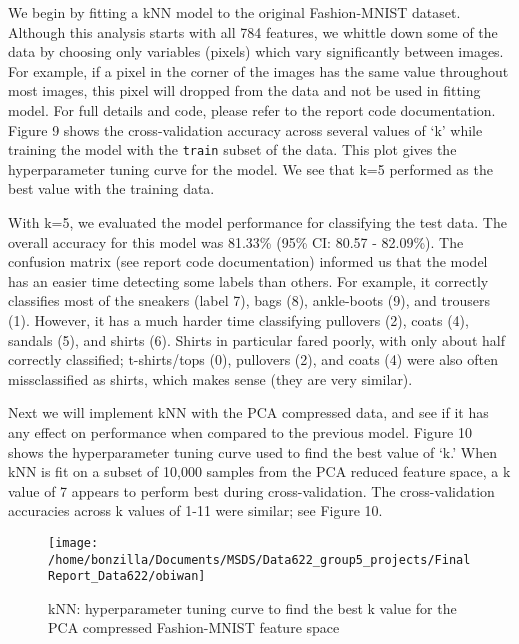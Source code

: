 \documentclass{article}
\begin{document}
We begin by fitting a kNN model to the original Fashion-MNIST dataset.
Although this analysis starts with all 784 features, we whittle down
some of the data by choosing only variables (pixels) which vary
significantly between images. For example, if a pixel in the corner of
the images has the same value throughout most images, this pixel will
dropped from the data and not be used in fitting model. For full details
and code, please refer to the report code documentation. Figure 9 shows
the cross-validation accuracy across several values of `k' while
training the model with the \texttt{train} subset of the data. This plot
gives the hyperparameter tuning curve for the model. We see that k=5
performed as the best value with the training data.

With k=5, we evaluated the model performance for classifying the test
data. The overall accuracy for this model was 81.33\% (95\% CI: 80.57 -
82.09\%). The confusion matrix (see report code documentation) informed
us that the model has an easier time detecting some labels than others.
For example, it correctly classifies most of the sneakers (label 7),
bags (8), ankle-boots (9), and trousers (1). However, it has a much
harder time classifying pullovers (2), coats (4), sandals (5), and
shirts (6). Shirts in particular fared poorly, with only about half
correctly classified; t-shirts/tops (0), pullovers (2), and coats (4)
were also often missclassified as shirts, which makes sense (they are
very similar).

Next we will implement kNN with the PCA compressed data, and see if it
has any effect on performance when compared to the previous model.
Figure 10 shows the hyperparameter tuning curve used to find the best
value of `k.' When kNN is fit on a subset of 10,000 samples from the PCA
reduced feature space, a k value of 7 appears to perform best during
cross-validation. The cross-validation accuracies across k values of
1-11 were similar; see Figure 10.

\begin{figure}

{\centering \texttt{[image: /home/bonzilla/Documents/MSDS/Data622\_group5\_projects/FinalReport\_Data622/obiwan]} 

}

\caption{kNN: hyperparameter tuning curve to find the best k value for the PCA compressed Fashion-MNIST feature space}\label{fig:unnamed-chunk-10}
\end{figure}
\end{document}
